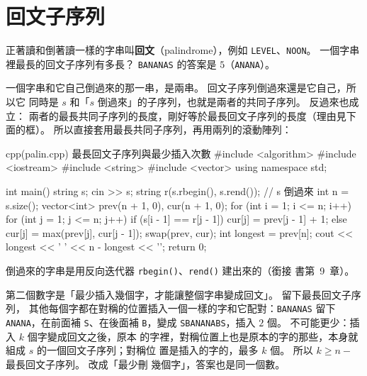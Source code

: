 \section{回文子序列}
\label{sec:ss-palin}

正著讀和倒著讀一樣的字串叫\textbf{回文}（palindrome），例如
\texttt{LEVEL}、\texttt{NOON}。 一個字串裡最長的回文子序列有多長？
\texttt{BANANAS} 的答案是 $5$（\texttt{ANANA}）。

一個字串和它自己倒過來的那一串，是兩串。 回文子序列倒過來還是它自己，所以它
同時是 $s$ 和「$s$ 倒過來」的子序列，也就是兩者的共同子序列。 反過來也成立：
兩者的最長共同子序列的長度，剛好等於最長回文子序列的長度（理由見下面的框）。
所以直接套用最長共同子序列，再用兩列的滾動陣列：

\begin{example}[label=ex:ss-palin]{cpp}{(palin.cpp) 最長回文子序列與最少插入次數}
#include <algorithm>
#include <iostream>
#include <string>
#include <vector>
using namespace std;

int main() {
    string s;
    cin >> s;
    string r(s.rbegin(), s.rend());     // s 倒過來
    int n = s.size();
    vector<int> prev(n + 1, 0), cur(n + 1, 0);
    for (int i = 1; i <= n; i++) {
        for (int j = 1; j <= n; j++) {
            if (s[i - 1] == r[j - 1]) {
                cur[j] = prev[j - 1] + 1;
            } else {
                cur[j] = max(prev[j], cur[j - 1]);
            }
        }
        swap(prev, cur);
    }
    int longest = prev[n];
    cout << longest << ' ' << n - longest << '\n';
    return 0;
}
\end{example}


倒過來的字串是用反向迭代器 \texttt{rbegin()}、\texttt{rend()} 建出來的（銜接
書第~9~章）。

第二個數字是「最少插入幾個字，才能讓整個字串變成回文」。 留下最長回文子序列，
其他每個字都在對稱的位置插入一個一樣的字和它配對：\texttt{BANANAS} 留下
\texttt{ANANA}，在前面補 \texttt{S}、在後面補 \texttt{B}，變成
\texttt{SBANANABS}，插入 $2$ 個。 不可能更少：插入 $k$ 個字變成回文之後，原本
的字裡，對稱位置上也是原本的字的那些，本身就組成 $s$ 的一個回文子序列；對稱位
置是插入的字的，最多 $k$ 個。 所以 $k \ge n - $ 最長回文子序列。 改成「最少刪
幾個字」，答案也是同一個數。

